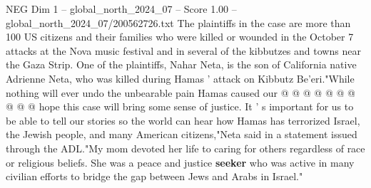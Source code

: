 \begin{textsample}{NEG Dim 1 – global\_north\_2024\_07 – Score 1.00 – global\_north\_2024\_07/200562726.txt}
The plaintiffs in the case are more than 100 US citizens and their families who were killed or wounded in the October 7 attacks at the Nova music festival and in several of the kibbutzes and towns near the Gaza Strip.
One of the plaintiffs, Nahar Neta, is the son of California native Adrienne Neta, who was killed during Hamas ' attack on Kibbutz Be'eri."While nothing will ever undo the unbearable pain Hamas caused our @ @ @ @ @ @ @ @ @ @ hope this case will bring some sense of justice.
It ' s important for us to be able to tell our stories so the world can hear how Hamas has terrorized Israel, the Jewish people, and many American citizens,"Neta said in a statement issued through the ADL."My mom devoted her life to caring for others regardless of race or religious beliefs.
She was a peace and justice \textbf{seeker} who was active in many civilian efforts to bridge the gap between Jews and Arabs in Israel."

\end{textsample}
